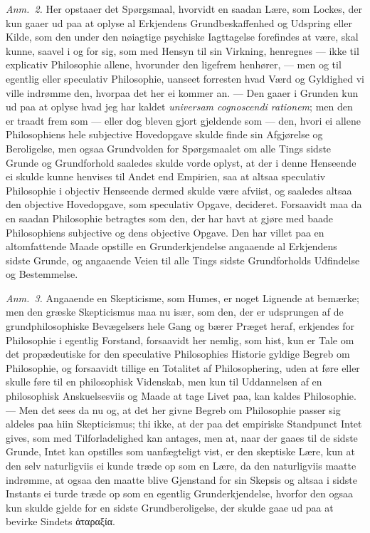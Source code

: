 \documentclass[12pt,a4paper]{book}
\newcommand{\apage}[1]{\marginnote{\footnotesize\textit{[#1]}}}
\begin{document}
  \apage{31}
{\small

\emph{Anm.~2.} Her opstaaer det Spørgsmaal, hvorvidt en saadan Lære, som
Lockes, der kun gaaer ud paa at oplyse al Erkjendens Grundbeskaffenhed og Udspring
eller Kilde, som den under den nøiagtige psychiske Iagttagelse forefindes at være,
skal kunne, saavel i og for sig, som med Hensyn til sin Virkning, henregnes ---
ikke til explicativ Philosophie allene, hvorunder den ligefrem henhører, --- men
og til egentlig eller speculativ Philosophie, uanseet forresten hvad Værd og
Gyldighed vi ville indrømme den, hvorpaa det her ei kommer an. --- Den gaaer i
Grunden kun ud paa at oplyse hvad jeg har kaldet \textit{universam cognoscendi
rationem}; men den er traadt frem som --- eller dog bleven gjort gjeldende som ---
den, hvori ei allene Philosophiens hele subjective Hovedopgave skulde finde sin
Afgjørelse og Beroligelse, men ogsaa Grundvolden for Spørgsmaalet om alle Tings
sidste Grunde og Grundforhold saaledes skulde vorde oplyst, at der i denne
Henseende ei skulde kunne henvises til Andet end Empirien, saa at altsaa speculativ
Philosophie i objectiv Henseende dermed skulde være afviist, og saaledes altsaa
den objective Hovedopgave, som speculativ Opgave, decideret. Forsaavidt maa da en
saadan Philosophie betragtes som den, der har havt at gjøre med baade Philosophiens
subjective og dens objective Opgave. Den har villet paa en altomfattende Maade
opstille en Grunderkjendelse angaaende al Erkjendens sidste Grunde, og angaaende
Veien til alle Tings sidste Grundforholds Udfindelse og Bestemmelse.\par}
  \apage{32}
{\small

\emph{Anm.~3.} Angaaende en Skepticisme, som Humes, er noget Lignende at
bemærke; men den græske Skepticismus maa nu især, som den, der er udsprungen af de
grundphilosophiske Bevægelsers hele Gang og bærer Præget heraf, erkjendes for
Philosophie i egentlig Forstand, forsaavidt her nemlig, som hist, kun er Tale om
det propædeutiske for den speculative Philosophies Historie gyldige Begreb om
Philosophie, og forsaavidt tillige en Totalitet af Philosophering, uden at føre
eller skulle føre til en philosophisk Videnskab, men kun til Uddannelsen af en
philosophisk Anskuelsesviis og Maade at tage Livet paa, kan kaldes Philosophie.
--- Men det sees da nu og, at det her givne Begreb om Philosophie passer sig
aldeles paa hiin Skepticismus; thi ikke, at der paa det empiriske Standpunct Intet
gives, som med Tilforladelighed kan antages, men at, naar der gaaes til de sidste
Grunde, Intet kan opstilles som uanfægteligt vist, er den skeptiske Lære, kun at
den selv naturligviis ei kunde træde op som en Lære, da den naturligviis maatte
indrømme, at ogsaa den maatte blive Gjenstand for sin Skepsis og altsaa i sidste
Instants ei turde træde op som en egentlig Grunderkjendelse, hvorfor den ogsaa kun
skulde gjelde for en sidste Grundberoligelse, der skulde gaae ud paa at bevirke
Sindets ἀταραξία.\par}
\end{document}
